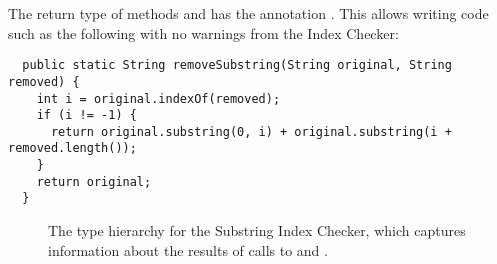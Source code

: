 
The return type of methods 
and  has the annotation
.
This allows writing code such as the following with no warnings from the
Index Checker:

\begin{Verbatim}
  public static String removeSubstring(String original, String removed) {
    int i = original.indexOf(removed);
    if (i != -1) {
      return original.substring(0, i) + original.substring(i + removed.length());
    }
    return original;
  }
\end{Verbatim}


\begin{figure}
\begin{center}
  \hfill
  \hfill
\end{center}
  \caption{The type hierarchy for the Substring Index Checker, which
    captures information about the results of calls to
    and
    .}
  \label{fig-index-substringindex}
\end{figure}

